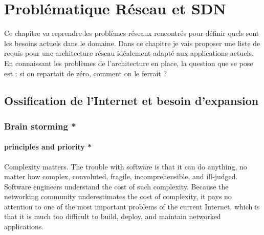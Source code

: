 \chapter{Problématique Réseau et SDN}
\label{chap-1}



Ce chapitre va reprendre les problèmes réseaux rencontrés pour définir quels sont les besoins actuels dans le domaine. Dans ce chapitre je vais proposer une liste de requis pour une architecture réseau idéalement adapté aux applications actuels.
En connaissant les problèmes de l'architecture en place, la question que se pose est : si on repartait de zéro, comment on le ferrait ?


\section{Ossification de l'Internet  et besoin d'expansion}

\subsection*{Brain storming *}

\subsubsection{principles and priority *}
Complexity matters. The trouble with software is that it can do anything, no matter how complex, convoluted, fragile, incomprehensible, and ill-judged.
Software engineers understand the cost of such complexity. Because the networking community underestimates the cost of complexity, it pays no attention to one of the most important problems of the current Internet, which is that it is much too difficult to build, deploy, and maintain networked applications.



